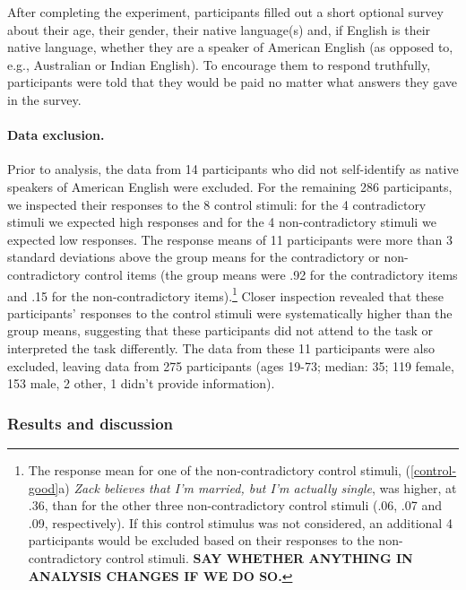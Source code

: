 \documentclass[11pt,fleqn]{article}
\newcommand{\6}{\mbox{$[\hspace*{-.6mm}[$}}
\newcommand{\9}{\mbox{$]\hspace*{-.6mm}]$}}
\begin{document}
After completing the experiment, participants filled out a short optional survey about their age, their gender, their native language(s) and, if English is their native language, whether they are a speaker of American English (as opposed to, e.g., Australian or Indian English). To encourage them to respond truthfully, participants were told that they would be paid no matter what answers they gave in the survey.

\paragraph{Data exclusion.}
Prior to analysis, the data from 14 participants who did not self-identify as native speakers of American English were excluded. For the remaining 286 participants, we inspected their responses to the 8 control stimuli: for the 4 contradictory stimuli we expected high responses and for the 4 non-contradictory stimuli we expected low responses. The response means of 11 participants were more than 3 standard deviations above the group means for the contradictory or non-contradictory control items (the group means were .92 for the contradictory items and .15 for the non-contradictory items).\footnote{The response mean for one of the non-contradictory control stimuli, (\ref{control-good}a) {\em Zack believes that I'm married, but I'm actually single}, was higher, at .36, than for the other three non-contradictory control stimuli (.06, .07 and .09, respectively). If this control stimulus was not considered, an additional 4 participants would be excluded based on their responses to the non-contradictory control stimuli. {\bf SAY WHETHER ANYTHING IN ANALYSIS CHANGES IF WE DO SO.}} Closer inspection revealed that these participants' responses to the control stimuli were systematically higher than the group means, suggesting that these participants did not attend to the task or interpreted the task differently. The data from these 11 participants were also excluded, leaving data from 275 participants (ages 19-73; median: 35; 119 female, 153 male, 2 other, 1 didn't provide information).  

\subsubsection{Results and discussion}
\end{document}
